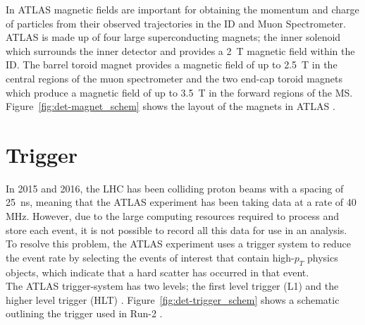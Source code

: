 In ATLAS magnetic fields are important for obtaining the momentum and charge of particles from their observed trajectories in the ID and Muon Spectrometer.
ATLAS is made up of four large superconducting magnets;
the inner solenoid which surrounds the inner detector and provides a 2~T magnetic field within the ID.
The barrel toroid magnet provides a magnetic field of up to 2.5~T in the central regions of the muon spectrometer and
the two end-cap toroid magnets which produce a magnetic field of up to 3.5~T in the forward regions of the MS.
Figure~\ref{fig:det-magnet_schem} shows the layout of the magnets in ATLAS \cite{det-magnet_fig}.\\

\section{Trigger}
\label{sec:det-trig}

In 2015 and 2016, the LHC has been colliding proton beams with a spacing of \SI{25}{\nano\second},
meaning that the ATLAS experiment has been taking data at a rate of 40 MHz.
However, due to the large computing resources required to process and store each event,
it is not possible to record all this data for use in an analysis.
To resolve this problem,
the ATLAS experiment uses a trigger system to reduce the event rate by
selecting the events of interest that contain high-$p_{T}$
physics objects, which indicate that a hard scatter has occurred in that event. \\

The ATLAS trigger-system has two levels;
the first level trigger (L1) and the higher level trigger (HLT) \cite{det-run2_trigger}.
Figure~\ref{fig:det-trigger_schem} shows a schematic outlining the trigger used in Run-2 \cite{det-run2_triggerPerf}. \\

